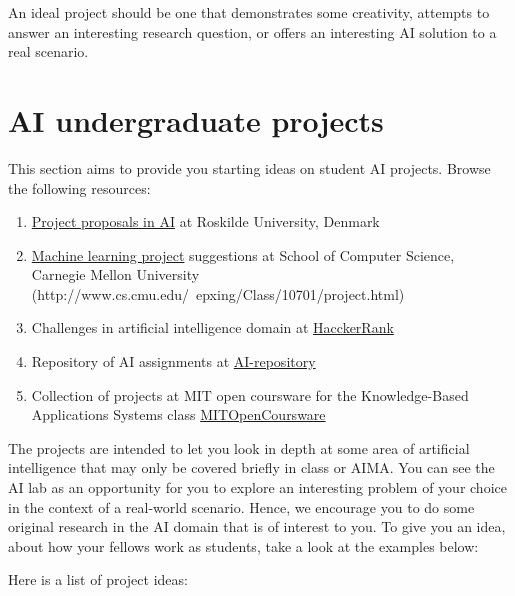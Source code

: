 \documentclass[a4paper,12pt]{report}
\begin{document}
An ideal project should be one that demonstrates some creativity, 
attempts to answer an interesting research question, 
or offers an interesting AI solution to a real scenario.

\section{AI undergraduate projects}
This section aims to provide you starting ideas on student AI projects.
Browse the following resources:  
\begin{enumerate}
 \item \href{http://www.akira.ruc.dk/~keld/teaching/projektforslag/ai_projects.pdf}{Project proposals in AI} at Roskilde University, Denmark
\item \href{http://www.cs.cmu.edu/~./10701/projects.html}{Machine learning project} suggestions at School of Computer Science, Carnegie Mellon University (http://www.cs.cmu.edu/~epxing/Class/10701/project.html)  
\item Challenges in artificial intelligence domain at \href{https://www.hackerrank.com/domains}{HacckerRank}
\item Repository of AI assignments at \href{http://modelai.gettysburg.edu/}{AI-repository}
\item Collection of projects at MIT open coursware for the Knowledge-Based Applications Systems class
\href{http://ocw.mit.edu/courses/electrical-engineering-and-computer-science/6-871-knowledge-based-applications-systems-spring-2005/projects/}{MITOpenCoursware}
\end{enumerate}

The projects are intended to let you look in depth at some area of artificial intelligence 
that may only be covered briefly in class or AIMA. 
You can see the AI lab as an opportunity for you to explore an interesting problem of your choice in the context of a real-world scenario.
Hence, we encourage you to do some original research in the AI domain that is of interest to you. 
To give you an idea, about how your fellows work as students, take a look at the examples below:

Here is a list of project ideas:
\end{document}
